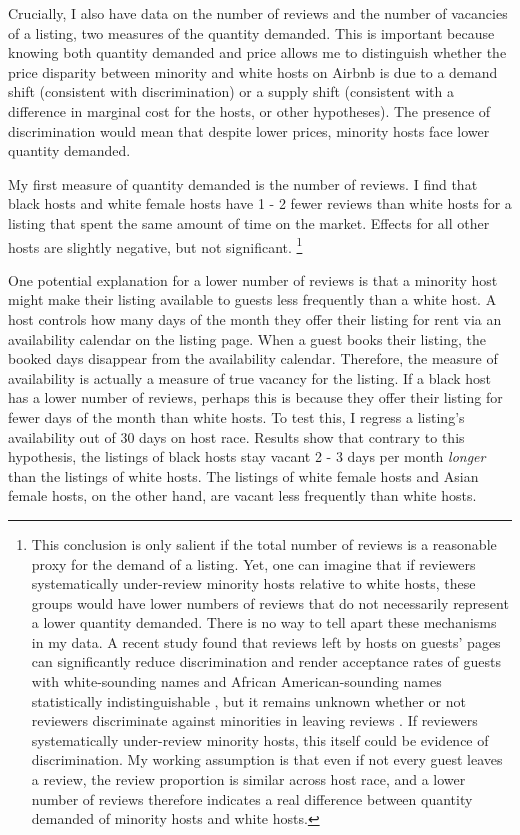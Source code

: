 Crucially, I also have data on the number of reviews and the number of vacancies of a listing, two measures of the quantity demanded. This is important because knowing both quantity demanded and price allows me to distinguish whether the price disparity between minority and white hosts on Airbnb is due to a demand shift (consistent with discrimination) or a supply shift (consistent with a difference in marginal cost for the hosts, or other hypotheses). The presence of discrimination would mean that despite lower prices, minority hosts face lower quantity demanded. 

My first measure of quantity demanded is the number of reviews. I find that black hosts and white female hosts have 1 - 2 fewer reviews than white hosts for a listing that spent the same amount of time on the market. Effects for all other hosts are slightly negative, but not significant.%
\footnote{This conclusion is only salient if the total number of reviews is a reasonable proxy for the demand of a listing. Yet, one can imagine that if reviewers systematically under-review minority hosts relative to white hosts, these groups would have lower numbers of reviews that do not necessarily represent a lower quantity demanded. There is no way to tell apart these mechanisms in my data. A recent study found that reviews left by hosts on guests’ pages can significantly reduce discrimination and render acceptance rates of guests with white-sounding names and African American-sounding names statistically indistinguishable \citep{cui}, but it remains unknown whether or not reviewers discriminate against minorities in leaving reviews \citep{ye}. If reviewers systematically under-review minority hosts, this itself could be evidence of discrimination. My working assumption is that even if not every guest leaves a review, the review proportion is similar across host race, and a lower number of reviews therefore indicates a real difference between quantity demanded of minority hosts and white hosts.}

One potential explanation for a lower number of reviews is that a minority host might make their listing available to guests less frequently than a white host. A host controls how many days of the month they offer their listing for rent via an availability calendar on the listing page. When a guest books their listing, the booked days disappear from the availability calendar. Therefore, the measure of availability is actually a measure of true vacancy for the listing. If a black host has a lower number of reviews, perhaps this is because they offer their listing for fewer days of the month than white hosts. To test this, I regress a listing's availability out of 30 days on host race. Results show that contrary to this hypothesis, the listings of black hosts stay vacant 2 - 3 days per month \textit{longer} than the listings of white hosts. The listings of white female hosts and Asian female hosts, on the other hand, are vacant less frequently than white hosts.

